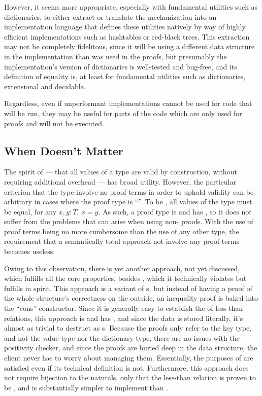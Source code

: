 However, it seems more appropriate, especially with
%
fundamental utilities such as dictionaries, to either extract or translate the mechanization into an implementation language that defines these utilities natively
%
by way of highly efficient implementations such as hashtables or red-black trees. This extraction may not be completely fidelitous, since it will be using a
%
different data structure in the implementation than was used in the proofs, but presumably the implementation's version of dictionaries is well-tested and bug-free,
%
and its definition of equality is, at least for fundamental utilities such as dictionaries, extensional and decidable.

Regardless, even if unperformant implementations
%
cannot be used for code that will be run, they may be useful for parts of the code which are only used for proofs and will not be executed.

\subsection{When \SemTot{} Doesn't Matter}
The spirit of \SemTot{} --- that all values of a type are valid by construction, without requiring additional overhead --- has broad utility.
%
However, the particular criterion that the type involve no proof terms in order to uphold validity can be arbitrary in cases where the proof type is ``\emph{\prop}''.
%
To be \prop, all values of the type must be equal, \ie{} for any $x,y : T$, $x = y$.
%
As such, a \prop{} proof type is \extensional{} and has \EqDec, so it does not suffer from the problems that can arise when using non-\prop{} proofs.
%
With the use of proof terms being no more cumbersome than the use of any other type, the requirement that a semantically total approach not involve any proof terms becomes useless.

Owing to this observation, there is yet another approach, not yet discussed, which fulfills all the core properties, besides \SemTot, which it technically violates but fulfills in spirit.
%
This approach is a variant of \cal{}s, but instead of having a proof of the whole structure's correctness on the outside, an inequality proof is baked into the ``cons'' constructor.
%
Since it is generally easy to establish the \propity{} of less-than relations, this approach is \extensional{} and has \EqDec,
%
and since the data is stored literally, it's almost as trivial to destruct as \cal{}s.
%
Because the proofs only refer to the key type, and not the value type nor the dictionary type, there are no issues with the positivity checker,
%
and since the proofs are buried deep in the data structure, the client never has to worry about managing them.
%
Essentially, the purposes of \SemTot{} are satisfied even if its technical definition is not.
%
Furthermore, this approach does not require bijection to the naturals, only that the less-than relation is proven to be \prop,
%
and is substantially simpler to implement than \dds.

